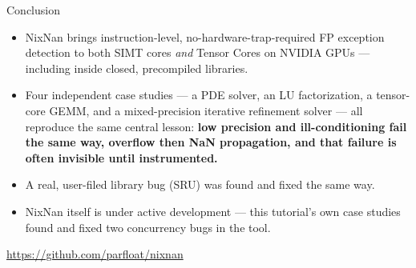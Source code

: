 \documentclass[aspectratio=169,11pt]{beamer}
\begin{document}
\begin{frame}{Conclusion}
\begin{itemize}
  \item NixNan brings instruction-level, no-hardware-trap-required FP
    exception detection to both SIMT cores \emph{and} Tensor Cores on NVIDIA
    GPUs --- including inside closed, precompiled libraries.
  \item Four independent case studies --- a PDE solver, an LU factorization,
    a tensor-core GEMM, and a mixed-precision iterative refinement solver ---
    all reproduce the same central lesson: \textbf{low precision and
    ill-conditioning fail the same way, overflow then NaN propagation, and
    that failure is often invisible until instrumented.}
  \item A real, user-filed library bug (SRU) was found and fixed the same way.
  \item NixNan itself is under active development --- this tutorial's own
    case studies found and fixed two concurrency bugs in the tool.
\end{itemize}
\vspace{1em}
\centering
\url{https://github.com/parfloat/nixnan}
\end{frame}
\end{document}

